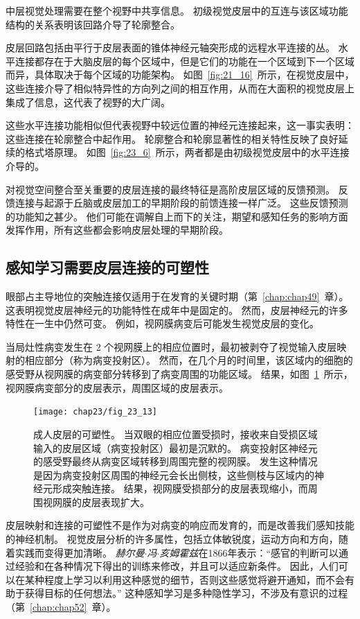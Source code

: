 中层视觉处理需要在整个视野中共享信息。
初级视觉皮层中的互连与该区域功能结构的关系表明该回路介导了轮廓整合。


皮层回路包括由平行于皮层表面的锥体神经元轴突形成的远程水平连接的丛。
水平连接都存在于大脑皮层的每个区域中，但是它们的功能在一个区域到下一个区域而异，具体取决于每个区域的功能架构。
如图~\ref{fig:21_16}~所示，在视觉皮层中，这些连接介导了相似特异性的方向列之间的相互作用，从而在大面积的视觉皮层上集成了信息，这代表了视野的大广阔。


这些水平连接功能相似但代表视野中较远位置的神经元连接起来，这一事实表明：这些连接在轮廓整合中起作用。
轮廓整合和轮廓显著性的相关特性反映了良好延续的格式塔原理。
如图~\ref{fig:23_6}~所示，两者都是由初级视觉皮层中的水平连接介导的。


对视觉空间整合至关重要的皮层连接的最终特征是高阶皮层区域的反馈预测。
反馈连接与起源于丘脑或皮层加工的早期阶段的前馈连接一样广泛。
这些反馈预测的功能知之甚少。
他们可能在调解自上而下的关注，期望和感知任务的影响方面发挥作用，所有这些都会影响皮层处理的早期阶段。



\subsection{感知学习需要皮层连接的可塑性}

眼部占主导地位的突触连接仅适用于在发育的关键时期（第~\ref{chap:chap49}~章）。
这表明视觉皮层神经元的功能特性在成年中是固定的。
然而，皮层神经元的许多特性在一生中仍然可变。
例如，视网膜病变后可能发生视觉皮层的变化。


当局灶性病变发生在 2 个视网膜上的相应位置时，最初被剥夺了视觉输入皮层映射的相应部分（称为病变投射区）。
然而，在几个月的时间里，该区域内的细胞的感受野从视网膜的病变部分转移到了病变周围的功能区域。
结果，如图~\ref{fig:23_13}~所示，视网膜病变部分的皮层表示，周围区域的皮层表示。


\begin{figure}[htbp]
	\centering
	\texttt{[image: chap23/fig\_23\_13]}
	\caption{成人皮层的可塑性。
		当双眼的相应位置受损时，接收来自受损区域输入的皮层区域（病变投射区）最初是沉默的。
		病变投射区神经元的感受野最终从病变区域转移到周围完整的视网膜。
		发生这种情况是因为病变投射区周围的神经元会长出侧枝，这些侧枝与区域内的神经元形成突触连接。
		结果，视网膜受损部分的皮层表现缩小，而周围视网膜的皮层表现扩大。}
	\label{fig:23_13}
\end{figure}


皮层映射和连接的可塑性不是作为对病变的响应而发育的，而是改善我们感知技能的神经机制。
视觉皮层分析的许多属性，包括立体敏锐度，运动方向和方向，随着实践而变得更加清晰。
\textit{赫尔曼$\cdot$冯$\cdot$亥姆霍兹}在1866年表示：“感官的判断可以通过经验和在各种情况下得出的训练来修改，并且可以适应新条件。
因此，人们可以在某种程度上学习以利用这种感觉的细节，否则这些感觉将避开通知，而不会有助于获得目标的任何想法。” 
这种感知学习是多种隐性学习，不涉及有意识的过程（第~\ref{chap:chap52}~章）。


